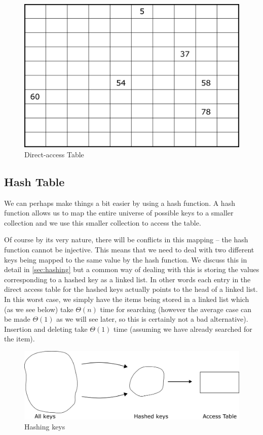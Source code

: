 \begin{figure}
    \centering
    \includegraphics[scale=0.3]{Images/direct_access_table.png}
    \caption{Direct-access Table}
    \label{fig:dat}
\end{figure}

\subsection{Hash Table}
We can perhaps make things a bit easier by using a hash function. A hash function allows us to map the entire universe of possible keys to a smaller collection and we use this smaller collection to access the table. 

Of course by its very nature, there will be conflicts in this mapping -- the hash function cannot be injective. This means that we need to deal with two different keys being mapped to the same value by the hash function. We discuss this in detail in \autoref{sec:hashing} but a common way of dealing with this is storing the values corresponding to a hashed key as a linked list. In other words each entry in the direct access table for the hashed keys actually points to the head of a linked list. In this worst case, we simply have the items being stored in a linked list which (as we see below) take $\Theta(n)$ time for searching (however the average case can be made $\Theta(1)$ as we will see later, so this is certainly not a bad alternative). Insertion and deleting take $\Theta(1)$ time (assuming we have already searched for the item).

\begin{figure}[h]
    \centering
    \includegraphics[scale=0.3]{Images/hash_table.png}
    \caption{Hashing keys}
    \label{fig:hash_table}
\end{figure}


